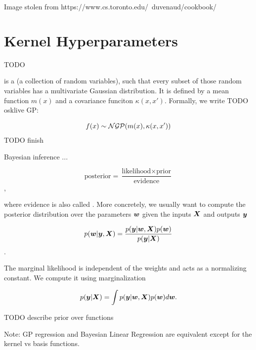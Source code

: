 Image stolen from https://www.cs.toronto.edu/~duvenaud/cookbook/

\section{Kernel Hyperparameters}

TODO


\begin{tcolorbox}
     is a  (a collection of random variables), such that every subset of those random variables has a multivariate Gaussian distribution. It is defined by a mean function $m(x)$ and a covariance funciton $\kappa(x, x')$. Formally, we write {TODO osklive GP}:
    
    \begin{equation}
    f(x) \sim {\mathcal{N}} {\mathcal{G}} {\mathcal{P}} (m(x), \kappa(x, x'))
    \end{equation} {TODO finish}
    
    Bayesian inference ...
    
    \begin{equation}
        \text{posterior} = \frac{\text{likelihood} \times \text{prior}}{\text{evidence}}
    \end{equation},
    
    where evidence is also called . More concretely, we usually want to compute the posterior distribution over the parameters ${\bm{w}}$ given the inputs ${\bm{X}}$ and outputs ${\bm{y}}$
    
    \begin{equation}
        p({\bm{w}} | {\bm{y}}, {\bm{X}}) = \frac{p({\bm{y}} | {\bm{w}}, {\bm{X}}) p({\bm{w}})}{p({\bm{y}} | {\bm{X}})}
    \end{equation}.
    
    The marginal likelihood is independent of the weights and acts as a normalizing constant. We compute it using marginalization
    
    \begin{equation}
        p({\bm{y}} | {\bm{X}}) = \int p({\bm{y}} | {\bm{w}}, {\bm{X}}) p({\bm{w}}) d {\bm{w}}.
    \end{equation}
    
    {TODO describe prior over functions}
\end{tcolorbox}

Note: GP regression and Bayesian Linear Regression are equivalent except for the kernel vs basis functions.

